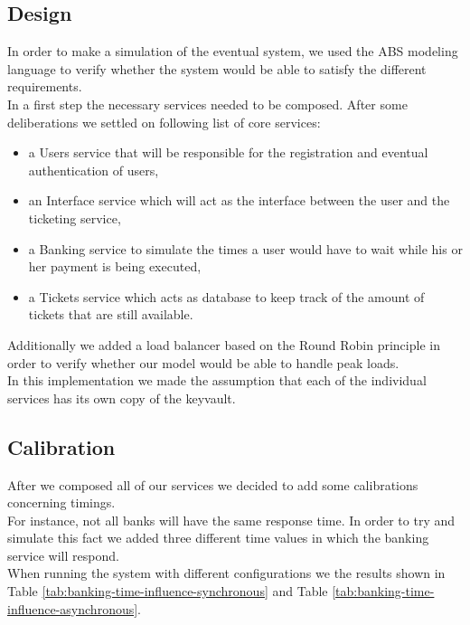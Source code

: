 \documentclass[10pt,a4paper,twocolumn]{article}
\begin{document}
\subsection{Design}
In order to make a simulation of the eventual system, we used the ABS modeling language to verify whether the system would be able to satisfy the different requirements.\\
In a first step the necessary services needed to be composed. After some deliberations we settled on following list of core services:
\begin{itemize}
	\item a Users service that will be responsible for the registration and eventual authentication of users,
	\item an Interface service which will act as the interface between the user and the ticketing service,
	\item a Banking service to simulate the times a user would have to wait while his or her payment is being executed,
	\item a Tickets service which acts as database to keep track of the amount of tickets that are still available.
\end{itemize}
Additionally we added a load balancer based on the Round Robin principle in order to verify whether our model would be able to handle peak loads.\\
In this implementation we made the assumption that each of the individual services has its own copy of the keyvault.

\subsection{Calibration}
After we composed all of our services we decided to add some calibrations concerning timings.\\
For instance, not all banks will have the same response time. In order to try and simulate this fact we added three different time values in which the banking service will respond. \\
When running the system with different configurations we the results shown in Table \ref{tab:banking-time-influence-synchronous} and Table \ref{tab:banking-time-influence-asynchronous}.
\end{document}
